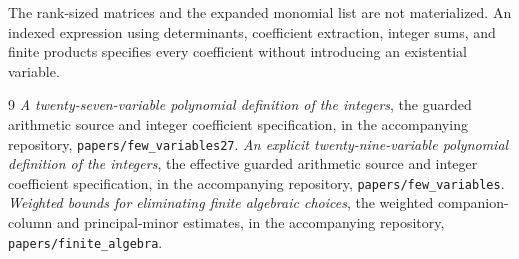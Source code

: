 \documentclass[11pt,a4paper]{article}
\begin{document}
The rank-sized matrices and the expanded monomial list are not
materialized. An indexed expression using determinants, coefficient
extraction, integer sums, and finite products specifies every
coefficient without introducing an existential variable.

\begin{thebibliography}{9}
\emph{A twenty-seven-variable polynomial definition of the integers},
the guarded arithmetic source and integer coefficient specification,
in the accompanying repository, \nolinkurl{papers/few_variables27}.
\emph{An explicit twenty-nine-variable polynomial definition of the integers},
the effective guarded arithmetic source and integer coefficient
specification, in the accompanying repository,
\nolinkurl{papers/few_variables}.
\emph{Weighted bounds for eliminating finite algebraic choices},
the weighted companion-column and principal-minor estimates,
in the accompanying repository, \nolinkurl{papers/finite_algebra}.
\end{thebibliography}
\end{document}
